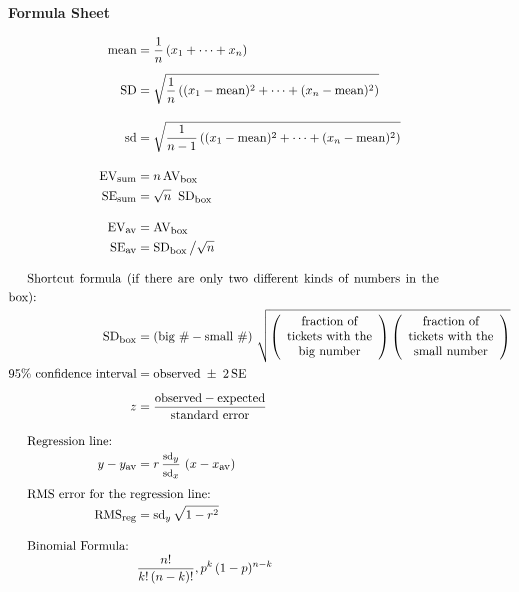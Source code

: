 \documentclass[10pt]{article}
\begin{document}
\begin{center}
\textbf{\large Formula Sheet}
\end{center}\vspace{-15pt}
\begin{align*}
\mbox{mean} &=\frac{1}{n}\left(x_1 + \cdots + x_n\right)\\[5pt]
\mbox{SD}   &=\sqrt{\frac{1}{n}\left( (x_1 - \mbox{mean})^2 + \cdots + (x_n - \mbox{mean})^2\right)}\\[10pt]
\mbox{sd}   &=\sqrt{\frac{1}{n-1}\left( (x_1 - \mbox{mean})^2 + \cdots + (x_n - \mbox{mean})^2\right)}\\[10pt]
%
\mbox{EV}_{\mbox{\footnotesize sum}} & = n\,\mbox{AV}_{\mbox{\footnotesize box}}\\
\mbox{SE}_{\mbox{\footnotesize sum}} & = \sqrt{n}\;\;\mbox{SD}_{\mbox{\footnotesize box}}\\[10pt]
%
\mbox{EV}_{\mbox{\footnotesize av}} & = \mbox{AV}_{\mbox{\footnotesize box}}\\
\mbox{SE}_{\mbox{\footnotesize av}} & = \mbox{SD}_{\mbox{\footnotesize box}}\,\big{/}\sqrt{n}\\[10pt]
%
%
\noalign{Shortcut formula (if there are only two different kinds of numbers in the box):}
\mbox{SD}_{\mbox{\footnotesize box}} &=
  \left(\mbox{big \#} - \mbox{small \#}\right)\,\sqrt{
  \left(\begin{array}{c}\mbox{fraction of}\\ \mbox{tickets with the}\\ \mbox{big number}\end{array}\right)
  \left(\begin{array}{c}\mbox{fraction of}\\\mbox{tickets with the}\\\mbox{small number}\end{array}\right)}\\
%
\mbox{95\% confidence interval} &= \mbox{observed} \;\pm\; 2\,\mbox{SE}\\[5pt]
z &= \frac{\mbox{observed} - \mbox{expected}}{\mbox{standard error}}\\[10pt]
%
\noalign{Regression line:}
y - y_{\mbox{\footnotesize av}} &= r\,\frac{\mbox{\footnotesize sd}_y}{\mbox{\footnotesize sd}_x}\,
       \left(x - x_{\mbox{\footnotesize av}}\right)\\[5pt]
\noalign{RMS error for the regression line:}
\mbox{RMS}_{\mbox{\footnotesize reg}} &= \mbox{sd}_y\,\sqrt{1 - r^2}\\[10pt]
\noalign{Binomial Formula:}
&{} \frac{n!}{k!\,(n-k)!},p^k\,(1-p)^{n-k}
\end{align*}
\end{document}
